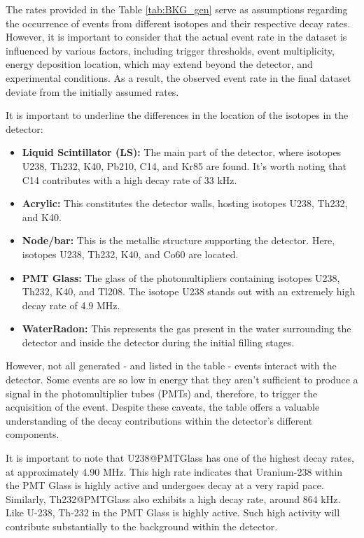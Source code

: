 The rates provided in the Table \ref{tab:BKG_gen} serve as assumptions regarding the occurrence of events from different isotopes and their respective decay rates. However, it is important to consider that the actual event rate in the dataset is influenced by various factors, including trigger thresholds, event multiplicity, energy deposition location, which may extend beyond the detector, and experimental conditions. As a result, the observed event rate in the final dataset deviate from the initially assumed rates.


It is important to underline the differences in the location of the isotopes in the detector:
\begin{small} 
\begin{itemize}
	\item \textbf{Liquid Scintillator (LS):} The main part of the detector, where isotopes U238, Th232, K40, Pb210, C14, and Kr85 are found. It's worth noting that C14 contributes with a high decay rate of 33 kHz.
	\item \textbf{Acrylic:} This constitutes the detector walls, hosting isotopes U238, Th232, and K40.
	\item \textbf{Node/bar:} This is the metallic structure supporting the detector. Here, isotopes U238, Th232, K40, and Co60 are located.
	\item \textbf{PMT Glass:} The glass of the photomultipliers containing isotopes U238, Th232, K40, and Tl208. The isotope U238 stands out with an extremely high decay rate of 4.9 MHz.
	\item \textbf{WaterRadon:} This represents the gas present in the water surrounding the detector and inside the detector during the initial filling stages.
\end{itemize}
\end{small}

However, not all generated - and listed in the table - events interact with the detector. Some events are so low in energy that they aren't sufficient to produce a signal in the photomultiplier tubes (PMTs) and, therefore, to trigger the acquisition of the event. Despite these caveats, the table offers a valuable understanding of the decay contributions within the detector's different components.

It is important to note that U238@PMTGlass has one of the highest decay rates, at approximately 4.90 MHz. This high rate indicates that Uranium-238 within the PMT Glass is highly active and undergoes decay at a very rapid pace. 
Similarly, Th232@PMTGlass also exhibits a high decay rate, around 864 kHz. Like U-238, Th-232 in the PMT Glass is highly active. Such high activity  will contribute substantially to the background within the detector.


